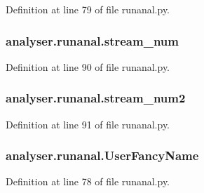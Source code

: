 Definition at line 79 of file runanal.\-py.

\hypertarget{namespaceanalyser_1_1runanal_a9ab10ca739edd64bcf02f5ae3a25fb24}{
\subsubsection[{stream\-\_\-num}]{\setlength{\rightskip}{0pt plus 5cm}analyser.\-runanal.\-stream\-\_\-num}}\label{namespaceanalyser_1_1runanal_a9ab10ca739edd64bcf02f5ae3a25fb24}


Definition at line 90 of file runanal.\-py.

\hypertarget{namespaceanalyser_1_1runanal_a1df2590e31d0ff6e6312a3168e8b100a}{
\subsubsection[{stream\-\_\-num2}]{\setlength{\rightskip}{0pt plus 5cm}analyser.\-runanal.\-stream\-\_\-num2}}\label{namespaceanalyser_1_1runanal_a1df2590e31d0ff6e6312a3168e8b100a}


Definition at line 91 of file runanal.\-py.

\hypertarget{namespaceanalyser_1_1runanal_a8a90baaed28192ee2dafa5a4843ae9ba}{
\subsubsection[{User\-Fancy\-Name}]{\setlength{\rightskip}{0pt plus 5cm}analyser.\-runanal.\-User\-Fancy\-Name}}\label{namespaceanalyser_1_1runanal_a8a90baaed28192ee2dafa5a4843ae9ba}


Definition at line 78 of file runanal.\-py.

